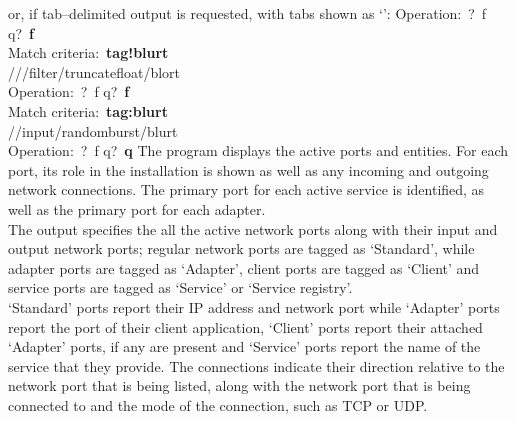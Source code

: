 \outputEnd{}
or, if tab--delimited output is requested, with tabs shown as `\tabSymbol':
\outputBegin{}
Operation:\ \openSq{}?\ f q\closeSq{}?\ \textbf{f}\\
Match criteria:\ \textbf{tag!blurt}\\
/\dollarService\pseudotab/\serviceName/filter/truncatefloat\pseudotab/blort\\
Operation:\ \openSq{}?\ f q\closeSq{}?\ \textbf{f}\\
Match criteria:\ \textbf{tag:blurt}\\
/\serviceName/input/randomburst/blurt\\
Operation:\ \openSq{}?\ f q\closeSq{}?\ \textbf{q}
\outputEnd{}
\newpage
{}
The program  displays the active \yarp{} ports and \mplusm{}
entities.
For each \yarp{} port, its role in the \mplusm{} installation is shown as well as any
incoming and outgoing \yarp{} network connections.
The primary port for each active service is identified, as well as the primary port for
each adapter.\\

The output specifies the all the active \yarp{} network ports along with their input and
output \yarp{} network ports; regular \yarp{} network ports are tagged as `Standard',
while \mplusm{} adapter ports are tagged as `Adapter', \mplusm{} client ports are tagged
as `Client' and \mplusm{} service ports are tagged as `Service' or `Service registry'.\\

`Standard' ports report their IP address and network port while `Adapter' ports report
the \mplusm{} port of their client application, `Client' ports report their attached
`Adapter' ports, if any are present and `Service' ports report the name of the \mplusm{}
service that they provide.
The connections indicate their direction relative to the \yarp{} network port that is
being listed, along with the \yarp{} network port that is being connected to and the mode
of the connection, such as TCP or UDP.\\

